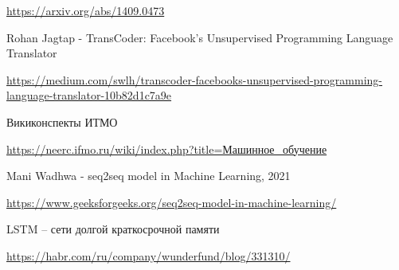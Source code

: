 \begin{thebibliography}{}
		\url{https://arxiv.org/abs/1409.0473}
		
		 Rohan Jagtap - TransCoder: Facebook’s Unsupervised Programming Language Translator
		
		\url{https://medium.com/swlh/transcoder-facebooks-unsupervised-programming-language-translator-10b82d1c7a9e}
		
		 Викиконспекты ИТМО
		
		\url{https://neerc.ifmo.ru/wiki/index.php?title=Машинное_обучение}
		
		 Mani Wadhwa - seq2seq model in Machine Learning, 2021
		
		\url{https://www.geeksforgeeks.org/seq2seq-model-in-machine-learning/}
		
		 LSTM – сети долгой краткосрочной памяти
		
		\url{https://habr.com/ru/company/wunderfund/blog/331310/}
	\end{thebibliography}




